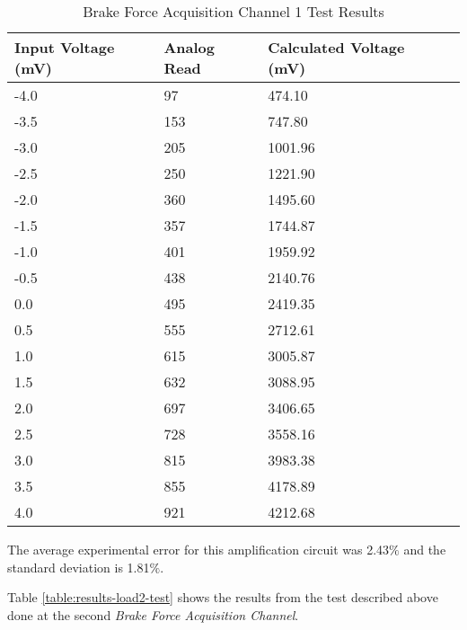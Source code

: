 				\begin{table}[h!]
					\begin{tabular}{|l|l|l|l|}
						\hline
						\textbf{Input Voltage (mV)} & \textbf{Analog Read} & \textbf{Calculated Voltage (mV)} \\ \hline
						-4.0 & 97 &  474.10 \\ \hline
						-3.5 & 153 & 747.80 \\ \hline
						-3.0 & 205 & 1001.96 \\ \hline
						-2.5 & 250 & 1221.90 \\ \hline
						-2.0 & 360 & 1495.60 \\ \hline
						-1.5 & 357 & 1744.87 \\ \hline
						-1.0 & 401 & 1959.92 \\ \hline
						-0.5 & 438 & 2140.76 \\ \hline
						 0.0 & 495 & 2419.35 \\ \hline
						 0.5 & 555 & 2712.61 \\ \hline
						 1.0 & 615 & 3005.87 \\ \hline
						 1.5 & 632 & 3088.95 \\ \hline
						 2.0 & 697 & 3406.65 \\ \hline
						 2.5 & 728 & 3558.16 \\ \hline
						 3.0 & 815 & 3983.38 \\ \hline
						 3.5 & 855 & 4178.89 \\ \hline
						 4.0 & 921 & 4212.68 \\ \hline
					\end{tabular}
					\caption{Brake Force Acquisition Channel 1 Test Results}
					\label{table:results-load1-test}
				\end{table}

			The average experimental error for this amplification circuit was 2.43$\%$ and the standard deviation is 1.81$\%$. 


			Table \ref{table:results-load2-test} shows the results from the test described above done at the second \textit{Brake Force Acquisition Channel}.

